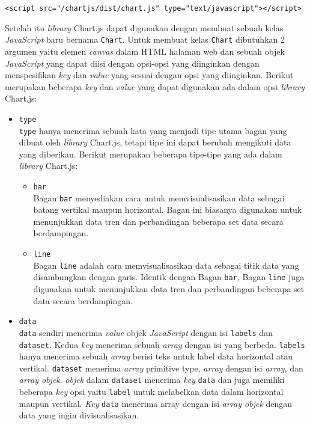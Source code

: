 \begin{center}
	\verb|<script src="/chartjs/dist/chart.js" type="text/javascript"></script>|
\end{center}

Setelah itu \textit{library} Chart.js dapat digunakan dengan membuat sebuah kelas \textit{JavaScript} baru bernama \verb|Chart|. Untuk membuat kelas \verb|Chart| dibutuhkan 2 argumen yaitu elemen \textit{canvas} dalam HTML halaman web dan sebuah objek \textit{JavaScript} yang dapat diisi dengan opsi-opsi yang diinginkan dengan menspesifikan \textit{key} dan \textit{value} yang sesuai dengan opsi yang diinginkan. Berikut merupakan beberapa \textit{key} dan \textit{value} yang dapat digunakan ada dalam opsi \textit{library} Chart.js:

\begin{itemize}
	\item \verb|type| \\
	\verb|type| hanya menerima sebuah kata yang menjadi tipe utama bagan yang dibuat oleh \textit{library} Chart.js, tetapi tipe ini dapat berubah mengikuti data yang diberikan. Berikut merupakan beberapa tipe-tipe yang ada dalam \textit{library} Chart.js:
	\begin{itemize}
		\item \verb|bar| \\
		Bagan \verb|bar| menyediakan cara untuk memvisualisasikan data sebagai batang vertikal maupun horizontal. Bagan ini biasanya digunakan untuk menunjukkan data tren dan perbandingan beberapa set data secara berdampingan.
		\item \verb|line| \\
		Bagan \verb|line| adalah cara memvisualisasikan data sebagai titik data yang disambungkan dengan garis. Identik dengan Bagan \verb|bar|, Bagan \verb|line| juga digunakan untuk menunjukkan data tren dan perbandingan beberapa set data secara berdampingan.
	\end{itemize}

	\item \verb|data| \\
	\verb|data| sendiri menerima \textit{value} objek \textit{JavaScript} dengan isi \verb|labels| dan \verb|dataset|. Kedua \textit{key} menerima sebuah \textit{array} dengan isi yang berbeda. \verb|labels| hanya menerima sebuah \textit{array} berisi teks untuk label data horizontal atau vertikal. \verb|dataset| menerima \textit{array} primitive type, \textit{array} dengan isi \textit{array}, dan \textit{array objek}. \textit{objek} dalam \verb|dataset| menerima \textit{key} \verb|data| dan juga memiliki beberapa \textit{key} opsi yaitu \verb|label| untuk melabelkan data dalam horizontal maupun vertikal. \textit{Key} \verb|data| menerima array dengan isi \textit{array objek} dengan data yang ingin divisualisasikan.


\end{itemize}
